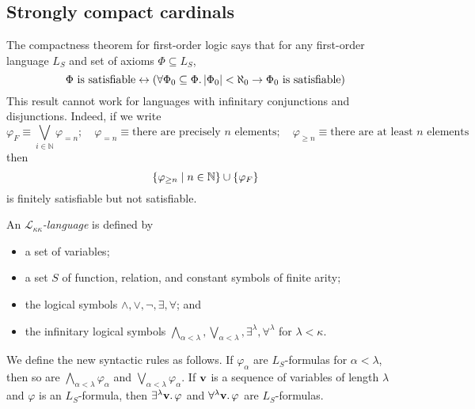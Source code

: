 \subsection{Strongly compact cardinals}
The compactness theorem for first-order logic says that for any first-order language \( L_S \) and set of axioms \( \Phi \subseteq L_S \),
\[ \Phi \text{ is satisfiable} \leftrightarrow \qty(\forall \Phi_0 \subseteq \Phi.\, \abs{\Phi_0} < \aleph_0 \to \Phi_0 \text{ is satisfiable}) \]
This result cannot work for languages with infinitary conjunctions and disjunctions.
Indeed, if we write
\[ \varphi_F \equiv \bigvee_{i \in \mathbb N} \varphi_{=n};\quad \varphi_{=n} \equiv \text{there are precisely } n \text{ elements};\quad \varphi_{\geq n} \equiv \text{there are at least } n \text{ elements} \]
then
\[ \qty{\varphi_{\geq n} \mid n \in \mathbb N} \cup \qty{\varphi_F} \]
is finitely satisfiable but not satisfiable.
\begin{definition}
    An \emph{\( \mathcal L_{\kappa\kappa} \)-language} is defined by
    \begin{itemize}
        \item a set of variables;
        \item a set \( S \) of function, relation, and constant symbols of finite arity;
        \item the logical symbols \( \wedge, \vee, \neg, \exists, \forall \); and
        \item the infinitary logical symbols \( \bigwedge_{\alpha < \lambda}, \bigvee_{\alpha < \lambda}, \exists^\lambda, \forall^\lambda \) for \( \lambda < \kappa \).
    \end{itemize}
\end{definition}
We define the new syntactic rules as follows.
If \( \varphi_\alpha \) are \( L_S \)-formulas for \( \alpha < \lambda \), then so are \( \bigwedge_{\alpha < \lambda} \varphi_\alpha \) and \( \bigvee_{\alpha < \lambda} \varphi_\alpha \).
If \( \vb v \) is a sequence of variables of length \( \lambda \) and \( \varphi \) is an \( L_S \)-formula, then \( \exists^\lambda \vb v.\, \varphi \) and \( \forall^\lambda \vb v.\, \varphi \) are \( L_S \)-formulas.


